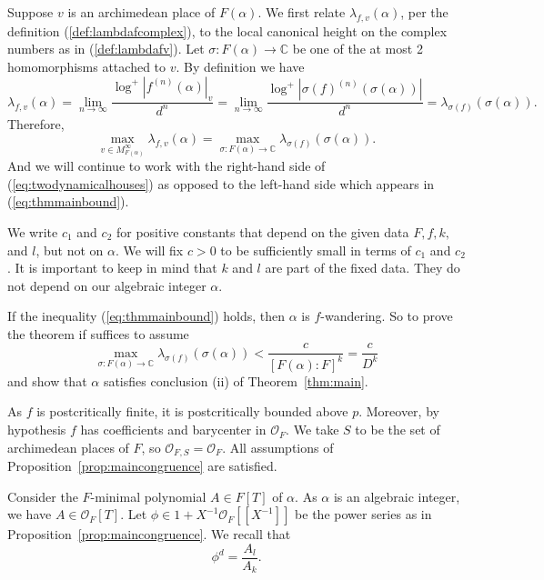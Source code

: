 \documentclass[12pt,oneside,a4]{amsart}
\newcommand{\IC}{\mathbb{C}}
\newcommand{\cO}{\mathcal{O}}
\numberwithin{maincounter}{section}
\numberwithin{equation}{section}
\begin{document}
Suppose $v$ is an archimedean place of $F(\alpha)$.
We first relate $\lambda_{f,v}(\alpha)$, per the definition
(\ref{def:lambdafcomplex}), to the local canonical height on the
complex numbers as in (\ref{def:lambdafv}).
Let $\sigma\colon
F(\alpha)\rightarrow \IC$ be one of the at most 2 homomorphisms 
attached to $v$. By definition we have 
\begin{equation*}  
  \lambda_{f,v}(\alpha) = \lim_{n\rightarrow\infty}
  \frac{\log^+ |f^{(n)}(\alpha)|_v}{d^n}
  =  \lim_{n\rightarrow\infty}
  \frac{\log^+|\sigma(f)^{(n)}(\sigma(\alpha))|}{d^n}
  =\lambda_{\sigma(f)}(\sigma(\alpha)).
\end{equation*}
Therefore,
\begin{equation}
  \label{eq:twodynamicalhouses}
  \max_{v\in M_{F(\alpha)}^\infty} \lambda_{f,v}(\alpha)=
  \max_{\sigma\colon F(\alpha)\rightarrow \IC}
  \lambda_{\sigma(f)}(\sigma(\alpha)). 
\end{equation}
And we will continue to work with the right-hand side of
(\ref{eq:twodynamicalhouses}) as opposed to the left-hand side which
appears in (\ref{eq:thmmainbound}).



We write $c_1$ and $c_2$ for positive constants that depend on the
given data $F,f,k,$ and $l$,
but not on $\alpha$. We will fix $c>0$ to be sufficiently small   in terms of
$c_1$ and $c_2$.
It is important to keep in mind that $k$ and $l$ are part of the fixed
data. 
They do not depend on our algebraic integer $\alpha$.


If the inequality (\ref{eq:thmmainbound}) holds, then $\alpha$ is $f$-wandering. 
So to prove the theorem if suffices to assume 
\begin{equation}
  \label{eq:lambdasigmafsmallworkinghyp}
  \max_{\sigma \colon  F(\alpha)\rightarrow \IC}
  \lambda_{\sigma(f)}(\sigma(\alpha))< \frac{c}{[F(\alpha):F]^{k}}=\frac{c}{D^k}
\end{equation}
and show that $\alpha$ satisfies conclusion (ii) of Theorem~\ref{thm:main}.


As $f$ is postcritically finite, it is postcritically bounded above
$p$. 
Moreover, by hypothesis $f$  has coefficients and barycenter in $\cO_F$.
We take $S$ to be the set of
archimedean places of $F$, so $\cO_{F,S}=\cO_F$.
All assumptions of
Proposition~\ref{prop:maincongruence} are satisfied.




Consider the
$F$-minimal polynomial $A\in F[T]$ of $\alpha$. As $\alpha$ is an
algebraic integer, we have $A\in \cO_F[T]$. 
Let $\phi \in 1+ X^{-1}\cO_F[[X^{-1}]]$ be the power series as in
Proposition~\ref{prop:maincongruence}. We recall that
\begin{equation*}
  \phi^d = \frac{A_l}{A_k}. 
\end{equation*}
\end{document}
